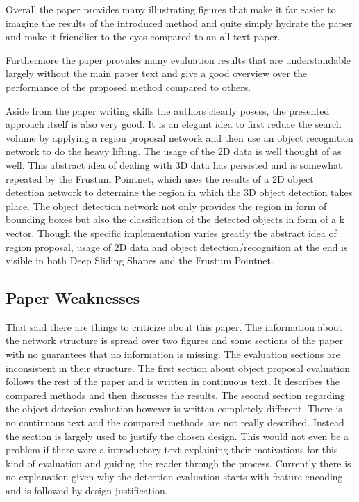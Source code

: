 \documentclass[12pt]{scrartcl}
\begin{document}
Overall the paper provides many illustrating figures that make it far easier
to imagine the results of the introduced method and quite simply hydrate the
paper and make it friendlier to the eyes compared to an all text paper.

Furthermore the paper provides many evaluation results that are understandable
largely without the main paper text and give a good overview over the performance
of the proposed method compared to others.

Aside from the paper writing skills the authors clearly posess, the presented
approach itself is also very good. It is an elegant idea to first reduce the
search volume by applying a region proposal network and then use an object recognition
network to do the heavy lifting. The usage of the 2D data is well thought of
as well. This abstract idea of dealing with 3D data has persisted and is somewhat
repeated by the Frustum Pointnet\cite{Qi2017}, which uses the results of a 2D
object detection network to determine the region in which the 3D object detection
takes place. The object detection network not only provides the region in form
of bounding boxes but also the classification of the detected objects in form
of a k vector. Though the specific implementation varies greatly the abstract
idea of region proposal, usage of 2D data and object detection/recognition at
the end is visible in both Deep Sliding Shapes and the Frustum Pointnet.


\subsection{Paper Weaknesses} %
\label{sub:paper_weaknesses}

That said there are things to criticize about this paper. The information about
the network structure is spread over two figures and some sections of the paper
with no guarantees that no information is missing. The evaluation sections are
inconsistent in their structure. The first section about object proposal evaluation
follows the rest of the paper and is written in continuous text. It describes the
compared methods and then discusses the results. The second section regarding the
object detecion evaluation however is written completely different. There is no
continuous text and the compared methods are not really described. Instead the
section is largely used to justify the chosen design. This would not even be a
problem if there were a introductory text explaining their motivations for this
kind of evaluation and guiding the reader through the process. Currently there
is no explanation given why the detection evaluation starts with feature encoding
and is followed by design justification.
\end{document}
